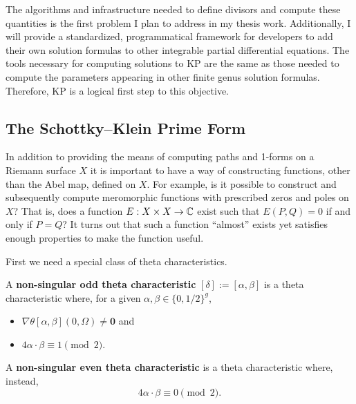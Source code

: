 The algorithms and infrastructure needed to define divisors and compute
these quantities is the first problem I plan to address in my thesis
work. Additionally, I will provide a standardized, programmatical
framework for developers to add their own solution formulas to other
integrable partial differential equations. The tools necessary for
computing solutions to KP are the same as those needed to compute the
parameters appearing in other finite genus solution formulas. Therefore,
KP is a logical first step to this objective.

\subsection{The Schottky--Klein Prime Form}


In addition to providing the means of computing paths and 1-forms on a
Riemann surface $X$ it is important to have a way of constructing
functions, other than the Abel map, defined on $X$. For example, is it
possible to construct and subsequently compute meromorphic functions
with prescribed zeros and poles on $X$? That is, does a function $E : X
\times X \to \operatorname{\mathbb{C}}$ exist such that $E(P,Q) = 0$ if and only if $P = Q$?
It turns out that such a function ``almost'' exists yet satisfies enough
properties to make the function useful.

First we need a special class of theta characteristics.
\begin{definition}
  A {\bf non-singular odd theta characteristic} $[\delta] := [\alpha,
    \beta]$ is a theta characteristic where, for a given $\alpha,\beta
  \in \{0,1/2\}^g$,
  \begin{itemize}
    \item $\nabla\theta[\alpha,\beta](0,\Omega) \neq \mathbf{0}$ and
    \item $4 \alpha \cdot \beta \equiv 1 \pmod{2}$.
  \end{itemize}
  A {\bf non-singular even theta characteristic} is a theta
  characteristic where, instead,
  \[
      4 \alpha \cdot \beta \equiv 0 \pmod{2}.
  \]
\end{definition}

